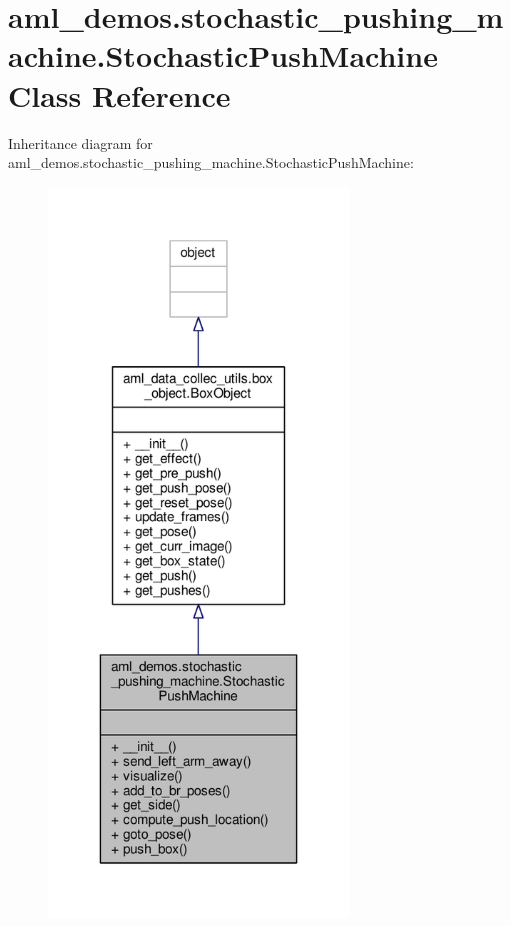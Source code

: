 \hypertarget{classaml__demos_1_1stochastic__pushing__machine_1_1_stochastic_push_machine}{\section{aml\-\_\-demos.\-stochastic\-\_\-pushing\-\_\-machine.\-Stochastic\-Push\-Machine Class Reference}
\label{classaml__demos_1_1stochastic__pushing__machine_1_1_stochastic_push_machine}
}


Inheritance diagram for aml\-\_\-demos.\-stochastic\-\_\-pushing\-\_\-machine.\-Stochastic\-Push\-Machine\-:
\nopagebreak
\begin{figure}[H]
\begin{center}
\leavevmode
\includegraphics[width=226pt]{classaml__demos_1_1stochastic__pushing__machine_1_1_stochastic_push_machine__inherit__graph}
\end{center}
\end{figure}


